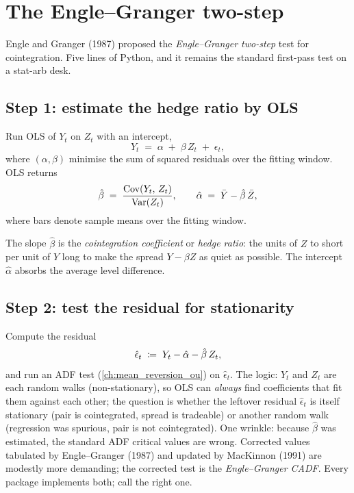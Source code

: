 \section{The Engle--Granger two-step}
\label{sec:ch10_engle_granger}

Engle and Granger (1987) proposed the \emph{Engle--Granger two-step}
test for cointegration. Five lines of Python, and it remains the
standard first-pass test on a stat-arb desk.

\subsection{Step 1: estimate the hedge ratio by OLS}
\label{subsec:ch10_eg_step1}

Run OLS of $Y_t$ on $Z_t$ with an intercept,
\begin{equation}
  Y_t \;=\; \alpha \;+\; \beta\,Z_t \;+\; \epsilon_t,
  \label{eq:eg_regression}
\end{equation}
where $(\alpha, \beta)$ minimise the sum of squared residuals over
the fitting window. OLS returns
\begin{equation}
  \hat\beta \;=\; \frac{\operatorname{Cov}(Y_t,\,Z_t)}{\operatorname{Var}(Z_t)},
  \qquad
  \hat\alpha \;=\; \bar{Y} - \hat\beta\,\bar{Z},
  \label{eq:eg_ols_formulae}
\end{equation}
where bars denote sample means over the fitting window.

The slope $\hat\beta$ is the \emph{cointegration coefficient} or
\emph{hedge ratio}: the units of $Z$ to short per unit of $Y$ long
to make the spread $Y - \beta Z$ as quiet as possible. The
intercept $\hat\alpha$ absorbs the average level difference.

\subsection{Step 2: test the residual for stationarity}
\label{subsec:ch10_eg_step2}

Compute the residual
\begin{equation}
  \hat\epsilon_t \;\coloneqq\; Y_t - \hat\alpha - \hat\beta\,Z_t,
  \label{eq:eg_residual}
\end{equation}
and run an ADF test (\cref{ch:mean_reversion_ou}) on
$\hat\epsilon_t$. The logic: $Y_t$ and $Z_t$ are each random walks
(non-stationary), so OLS can \emph{always} find coefficients that fit
them against each other; the question is whether the leftover
residual $\hat\epsilon_t$ is itself stationary (pair is cointegrated,
spread is tradeable) or another random walk (regression was
spurious, pair is not cointegrated). One wrinkle: because $\hat\beta$ was estimated,
the standard ADF critical values are wrong. Corrected values
tabulated by Engle--Granger (1987) and updated by MacKinnon
(1991) are modestly more demanding; the corrected test is the
\emph{Engle--Granger CADF}. Every package implements both; call
the right one.

